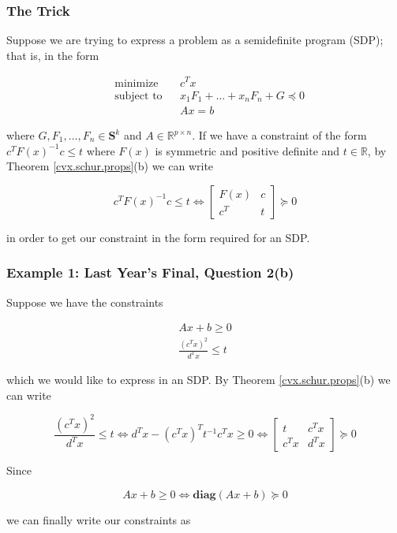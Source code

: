 \subsubsection{The Trick}

Suppose we are trying to express a problem as a semidefinite program (SDP); that is, in the form

\[
\begin{aligned}
& {\text{minimize}}
& & c^T x \\
& \text{subject to}
& & x_1F_1 + \ldots + x_n F_n + G \preceq 0 \\
& & & Ax = b
\end{aligned}
\]

where \(G, F_1, \ldots, F_n \in \boldsymbol{S}^k\) and \(A \in \mathbb{R}^{p \times n}\). If we have a constraint of the form \(c^TF(x)^{-1}c  \leq t\) where \(F(x)\) is symmetric and positive definite and \(t \in \mathbb{R}\), by Theorem \ref{cvx.schur.props}(b) we can write

\[
c^TF(x)^{-1}c  \leq t \iff  \begin{bmatrix}
    F(x)      & c \\
    c^T & t
\end{bmatrix} \succeq 0 
\]

in order to get our constraint in the form required for an SDP.

\subsubsection{Example 1: Last Year's Final, Question 2(b)}

Suppose we have the constraints

\[
\begin{aligned}
Ax + b \geq 0 \\
\frac{(c^Tx)^2}{d^Tx} \leq t
\end{aligned}
\]

which we would like to express in an SDP. By Theorem \ref{cvx.schur.props}(b) we can write

\[
\frac{(c^Tx)^2}{d^Tx} \leq t \iff d^Tx - (c^Tx)^T t^{-1} c^Tx \geq 0  \iff  \begin{bmatrix}
    t      & c^Tx \\
    c^Tx & d^Tx
\end{bmatrix} \succeq 0 
\]

Since

\[
Ax + b \geq 0 \iff \textbf{diag}(Ax + b) \succeq 0
\]

we can finally write our constraints as 

